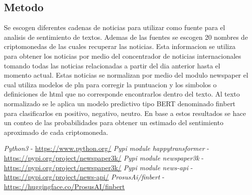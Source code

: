 \documentclass[12pt,jou]{apa7}
\begin{document}
\subsection{Metodo}\label{subsec:metodo}
Se escogen diferentes cadenas de noticias para utilizar como fuente
para el analisis de sentimiento de textos.
Ademas de las fuentes se escogen 20 nombres de criptomonedas de las cuales
recuperar las noticias.
Esta informacion se utiliza para obtener los noticias por medio
del concentrador de noticias internacionales tomando todas las noticias
relacionadas a partir del dia anterior hasta el momento actual.
Estas noticias se normalizan por medio del modulo newspaper el cual utiliza
modelos de pln para corregir la puntuacion y los simbolos o definiciones de html
que no corresponde encontrarlos dentro del texto.
Al texto normalizado se le aplica un modelo predictivo tipo BERT denominado finbert
para clasificarlos en positivo, negativo, neutro.
En base a estos resultados se hace un conteo de las probabilidades para
obtener un estimado del sentimiento aproximado de cada criptomoneda.
\pagebreak
\begin{thebibliography}{99}
 \emph{Python3} - \url{https://www.python.org/}
 \emph{Pypi module happytransformer} - \url{https://pypi.org/project/newspaper3k/}
 \emph{Pypi module newspaper3k} - \url{https://pypi.org/project/newspaper3k/}
 \emph{Pypi module news-api} - \url{https://pypi.org/project/news-api/}
 \emph{ProsusAi/finbert} - \url{https://huggingface.co/ProsusAI/finbert}
\end{thebibliography}
\end{document}
